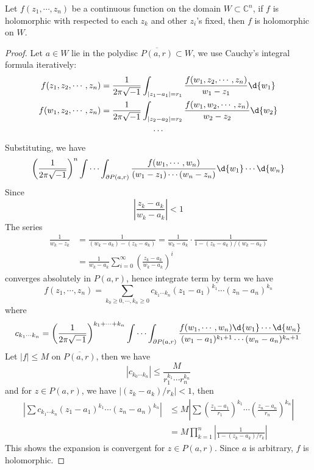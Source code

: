 \begin{thm}[Osgood]\label{osgood}
    Let $f(z_1,\cdots,z_n)$ be a continuous function on the domain $W\subset\mathbb{C}^n$, if $f$ is holomorphic with respected to each $z_k$ and other $z_i$'s fixed, then $f$ is holomorphic on $W$.
\end{thm}
\begin{proof}
    Let $a\in W$ lie in the polydisc $\overline{P(a,r)}\subset W$, we use Cauchy's integral formula iteratively:
    \begin{gather*}
        f(z_1,z_2,\cdots,z_n)=\frac{1}{2\pi\sqrt{-1}}\int_{|z_1-a_1|=r_1}\frac{f(w_1,z_2,\cdots,z_n)}{w_1-z_1}\d{w_1}\\
        f(w_1,z_2,\cdots,z_n)=\frac{1}{2\pi\sqrt{-1}}\int_{|z_2-a_2|=r_2}\frac{f(w_1,w_2,\cdots,z_n)}{w_2-z_2}\d{w_2}\\
        \cdots
    \end{gather*}
    Substituting, we have
    \[\left(\frac{1}{2\pi\sqrt{-1}}\right)^n\idotsint_{\partial P(a,r)}\frac{f(w_1,\cdots,w_n)}{(w_1-z_1)\cdots(w_n-z_n)}\d{w_1}\cdots\d{w_n}\]
    Since
    \[\left|\frac{z_k-a_k}{w_k-a_k}\right|<1\]
    The series
    \begin{align*}
        \frac{1}{w_k-z_k}&=\frac{1}{(w_k-a_k)-(z_k-a_k)}=\frac{1}{w_k-a_k}\cdot\frac{1}{1-(z_k-a_k)/(w_k-a_k)}\\
        &=\frac{1}{w_k-a_k}\sum_{i=0}^\infty\left(\frac{z_k-a_k}{w_k-a_k}\right)^i
    \end{align*}
    converges absolutely in $P(a,r)$, hence integrate term by term we have
    \[f(z_1,\cdots,z_n)=\sum_{k_0\geq 0,\cdots,k_n\geq 0}c_{k_1\cdots k_n}(z_1-a_1)^{k_1}\cdots(z_n-a_n)^{k_n}\]
    where
    \[c_{k_1\cdots k_n}=\left(\frac{1}{2\pi\sqrt{-1}}\right)^{k_1+\cdots+k_n}\idotsint_{\partial P(a,r)}\frac{f(w_1,\cdots,w_n)\d{w_1}\cdots\d{w_n}}{(w_1-a_1)^{k_1+1}\cdots(w_n-a_n)^{k_n+1}}\]
    Let $|f|\leq M$ on $\overline{P(a,r)}$, then we have
    \[|c_{k_0\cdots k_n}|\leq\frac{M}{r_1^{k_1}\cdots r_n^{k_n}}\]
    and for $z\in P(a,r)$, we have $|(z_k-a_k)/r_k|<1$, then
    \begin{align*}
        \left|\sum c_{k_1\cdots k_n}(z_1-a_1)^{k_1}\cdots(z_n-a_n)^{k_n}\right|&\leq M\left|\sum\left(\frac{z_1-a_1}{r_1}\right)^{k_1}\cdots\left(\frac{z_n-a_n}{r_n}\right)^{k_n}\right|\\
        &=M\prod_{k=1}^n\left|\frac{1}{1-(z_k-a_k)/r_k}\right|
    \end{align*}
    This shows the expansion is convergent for $z\in P(a,r)$.
    Since $a$ is arbitrary, $f$ is holomorphic.
\end{proof}

